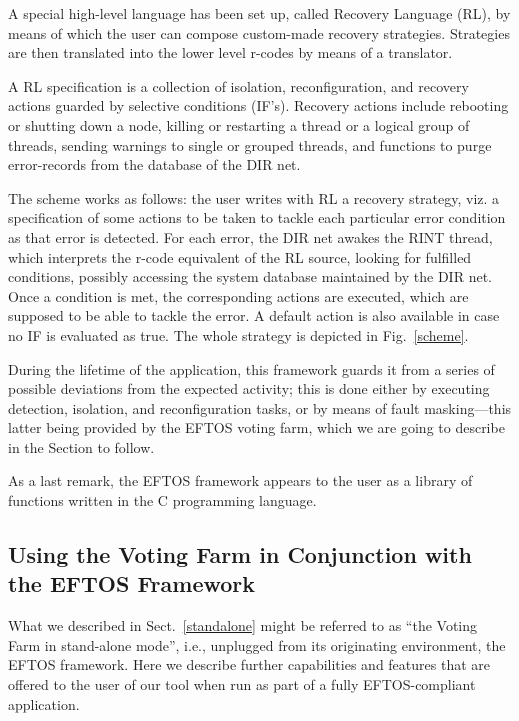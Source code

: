 \documentclass[11pt]{article}
\begin{document}
A special high-level language has been set up, called Recovery
Language (RL), by means of which the user can
compose custom-made recovery strategies.
Strategies are then translated into the lower level r-codes
by means of a translator. 

A RL specification is a collection of
isolation, reconfiguration, and recovery actions guarded by selective conditions ({\sf IF}'s).
Recovery actions include rebooting or shutting down a node, killing
or restarting a thread or a logical group of threads, sending
warnings to single or grouped threads, and functions to purge
error-records from the database of the DIR net.

The scheme works as follows: the user writes with RL a recovery strategy, 
viz. a specification of some actions to be taken to tackle each particular 
error condition as that error is detected. For each error, the DIR net awakes
the RINT thread, which interprets the r-code equivalent of the RL source,
looking for fulfilled conditions, possibly accessing the system database
maintained by the DIR net. Once a condition is met, the corresponding 
actions are executed, which are supposed to be able to tackle the error.
A default action is also available in case no {\sf IF} is evaluated as true.
The whole strategy is depicted in Fig.~\ref{scheme}.




During the lifetime of the application, this framework guards
it from a series of possible deviations from the expected
activity; this is done either by executing detection, isolation, and 
reconfiguration tasks, or by means of fault masking---this latter
being provided by the EFTOS voting farm, which we are going to describe 
in the Section to follow. 

As a last remark, the EFTOS framework appears
to the user as a library of functions written in the C programming language.


\subsection{Using the Voting Farm in Conjunction with the EFTOS Framework}
\label{rlsect}

What we described in Sect.~\ref{standalone} might be referred to as ``the Voting Farm 
in stand-alone mode'', i.e., unplugged from its originating environment,
the EFTOS framework. Here we describe further capabilities and
features that are offered to the user of our tool when run as
part of a fully EFTOS-compliant application.
\end{document}
